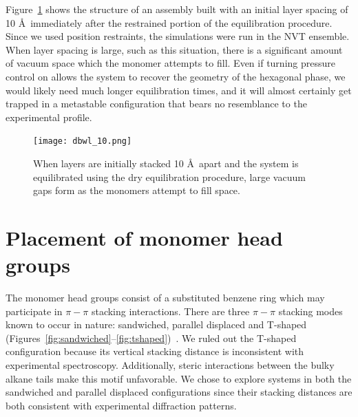 \documentclass{article}
\begin{document}
  Figure~\ref{fig:dbwl_10} shows the structure of an assembly built
  with an initial layer spacing of 10 \AA~immediately after the restrained
  portion of the equilibration procedure. Since we used position restraints, the
  simulations were run in the NVT ensemble. When layer spacing is large, such as
  this situation, there is a significant amount of vacuum space which the monomer
  attempts to fill. Even if turning pressure control on allows the system to
  recover the geometry of the hexagonal phase, we would likely need much longer
  equilibration times, and it will almost certainly get trapped in a metastable
  configuration that bears no resemblance to the experimental profile. 
 
  \begin{figure}[!htb]
	\centering
	\texttt{[image: dbwl\_10.png]}
	\caption{When layers are initially stacked 10 \AA~apart and the system
                is equilibrated using the dry equilibration procedure, large vacuum gaps
	form as the monomers attempt to fill space.}\label{fig:dbwl_10} 
  \end{figure}

  \clearpage
  \section{Placement of monomer head groups}
  
  The monomer head groups consist of a substituted benzene ring which may participate in
  $\pi-\pi$ stacking interactions. There are three $\pi-\pi$ stacking modes known
  to occur in nature: sandwiched, parallel displaced and T-shaped
  (Figures~\ref{fig:sandwiched}--\ref{fig:tshaped})~\cite{sinnokrot_estimates_2002}.
  We ruled out the T-shaped configuration because its vertical stacking distance is
  inconsistent with experimental spectroscopy. Additionally, steric interactions
  between the bulky alkane tails make this motif unfavorable. We chose to explore
  systems in both the sandwiched and parallel displaced configurations since their
  stacking distances are both consistent with experimental diffraction patterns.
  
\end{document}
